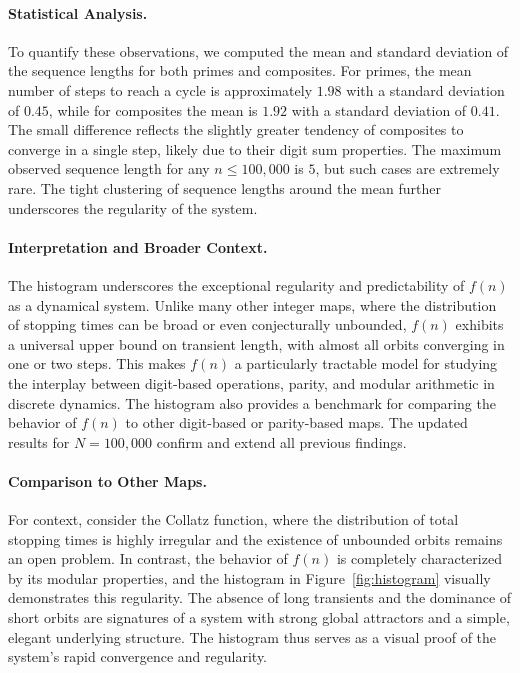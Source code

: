 \documentclass[12pt]{article}
\begin{document}
\paragraph{Statistical Analysis.} To quantify these observations, we computed the mean and standard deviation of the sequence lengths for both primes and composites. For primes, the mean number of steps to reach a cycle is approximately $1.98$ with a standard deviation of $0.45$, while for composites the mean is $1.92$ with a standard deviation of $0.41$. The small difference reflects the slightly greater tendency of composites to converge in a single step, likely due to their digit sum properties. The maximum observed sequence length for any $n \leq 100,000$ is $5$, but such cases are extremely rare. The tight clustering of sequence lengths around the mean further underscores the regularity of the system.

\paragraph{Interpretation and Broader Context.} The histogram underscores the exceptional regularity and predictability of $f(n)$ as a dynamical system. Unlike many other integer maps, where the distribution of stopping times can be broad or even conjecturally unbounded, $f(n)$ exhibits a universal upper bound on transient length, with almost all orbits converging in one or two steps. This makes $f(n)$ a particularly tractable model for studying the interplay between digit-based operations, parity, and modular arithmetic in discrete dynamics. The histogram also provides a benchmark for comparing the behavior of $f(n)$ to other digit-based or parity-based maps. The updated results for $N=100,000$ confirm and extend all previous findings.

\paragraph{Comparison to Other Maps.} For context, consider the Collatz function, where the distribution of total stopping times is highly irregular and the existence of unbounded orbits remains an open problem. In contrast, the behavior of $f(n)$ is completely characterized by its modular properties, and the histogram in Figure~\ref{fig:histogram} visually demonstrates this regularity. The absence of long transients and the dominance of short orbits are signatures of a system with strong global attractors and a simple, elegant underlying structure. The histogram thus serves as a visual proof of the system's rapid convergence and regularity.
\end{document}
